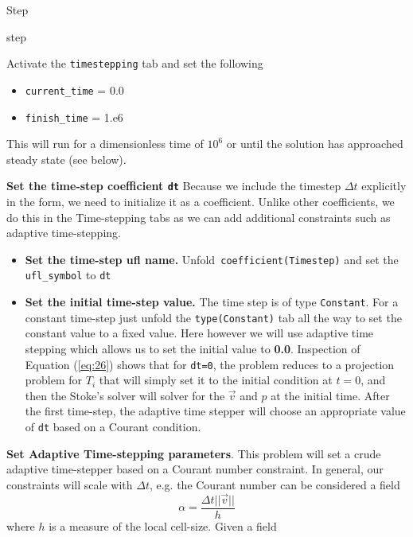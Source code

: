 \begin{steps}{Step}
  \begin{steps}{step}
    \item Activate the \texttt{timestepping} tab and set the following
    \begin{itemize}
    \item \texttt{current\_time} = 0.0
    \item \texttt{finish\_time} = 1.e6
    \end{itemize}
    This will run for a dimensionless time of $10^{6}$ or until the
    solution has approached steady state (see below).
  \item \textbf{Set the time-step coefficient \texttt{dt}} Because we
    include the timestep $\Delta t$ explicitly in the form, we need to
    initialize it as a coefficient.  Unlike other coefficients, we do
    this in the Time-stepping tabs as we can add additional
    constraints such as adaptive time-stepping.
    \begin{itemize}
    \item\textbf{ Set the time-step ufl name.} Unfold\texttt{ coefficient(Timestep)} and set the
      \texttt{ufl\_symbol} to \texttt{dt}
    \item \textbf{Set the initial time-step value.}  The time step is
      of type \texttt{Constant}.  For a constant time-step just unfold the \texttt{type(Constant)} tab all the way to set
      the constant value to a fixed value.  Here however we will use
      adaptive time stepping which allows us to set the initial value
      to \textbf{0.0}. Inspection of Equation (\ref{eq:26}) shows that
      for \texttt{dt=0}, the problem reduces to a projection problem
      for $T_{i}$ that will simply set it to the initial condition at
      $t=0$, and then the Stoke's solver will solver for the $\vec{v}$
      and $p$ at the initial time.  After the first time-step, the
      adaptive time stepper will choose an appropriate value of
      \texttt{dt} based on a Courant condition.
    \end{itemize}
  \item \textbf{Set Adaptive Time-stepping parameters}. This problem
    will set a crude adaptive time-stepper based on a Courant number
    constraint.  In general, our constraints will
    scale with $\Delta t$, e.g. the Courant number can be considered a
    field
    \begin{displaymath}
      \alpha = \frac{\Delta t ||\vec{v}||}{h}
    \end{displaymath}
    where $h$ is a measure of the local cell-size.  Given a field

\end{steps}
\end{steps}

